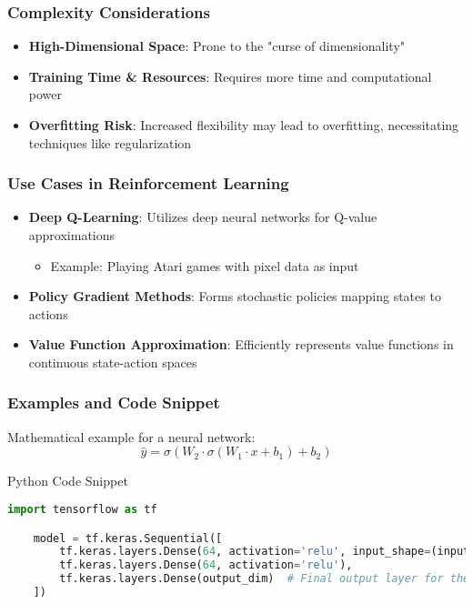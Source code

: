 \documentclass[aspectratio=169]{beamer}
\begin{document}
\begin{frame}[fragile]
    \frametitle{Complexity Considerations}
    \begin{itemize}
        \item \textbf{High-Dimensional Space}: Prone to the "curse of dimensionality"
        \item \textbf{Training Time \& Resources}: Requires more time and computational power
        \item \textbf{Overfitting Risk}: Increased flexibility may lead to overfitting, necessitating techniques like regularization
    \end{itemize}
\end{frame}

\begin{frame}[fragile]
    \frametitle{Use Cases in Reinforcement Learning}
    \begin{itemize}
        \item \textbf{Deep Q-Learning}: Utilizes deep neural networks for Q-value approximations
        \begin{itemize}
            \item Example: Playing Atari games with pixel data as input
        \end{itemize}
        \item \textbf{Policy Gradient Methods}: Forms stochastic policies mapping states to actions
        \item \textbf{Value Function Approximation}: Efficiently represents value functions in continuous state-action spaces
    \end{itemize}
\end{frame}

\begin{frame}[fragile]
    \frametitle{Examples and Code Snippet}
    Mathematical example for a neural network:
    \begin{equation}
        \hat{y} = \sigma(W_2 \cdot \sigma(W_1 \cdot x + b_1) + b_2)
    \end{equation}
    
    \begin{block}{Python Code Snippet}
    \begin{lstlisting}[language=Python]
    import tensorflow as tf

    model = tf.keras.Sequential([
        tf.keras.layers.Dense(64, activation='relu', input_shape=(input_dim,)),
        tf.keras.layers.Dense(64, activation='relu'),
        tf.keras.layers.Dense(output_dim)  # Final output layer for the function approximation
    ])
    \end{lstlisting}
    \end{block}
\end{frame}
\end{document}
